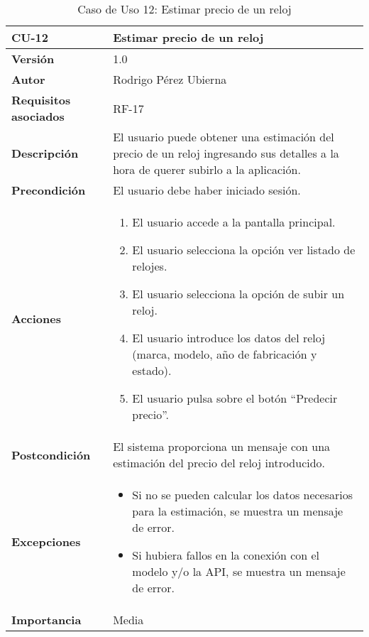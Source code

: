 \begin{table}[p]
	\centering
	\begin{tabularx}{\linewidth}{ p{} p{} }
		\toprule
		\textbf{CU-12} & \textbf{Estimar precio de un reloj}\\
		\toprule
		\textbf{Versión} & 1.0 \\
		\textbf{Autor} & Rodrigo Pérez Ubierna \\
		\textbf{Requisitos asociados} & RF-17 \\
		\textbf{Descripción} & El usuario puede obtener una estimación del precio de un reloj ingresando sus detalles a la hora de querer subirlo a la aplicación. \\
		\textbf{Precondición} & El usuario debe haber iniciado sesión. \\
		\textbf{Acciones} &
		\begin{enumerate}
			\def\labelenumi{\arabic{enumi}.}
			\tightlist
			\item El usuario accede a la pantalla principal.
			\item El usuario selecciona la opción ver listado de relojes.
			\item El usuario selecciona la opción de subir un reloj.
			\item El usuario introduce los datos del reloj (marca, modelo, año de fabricación y estado).
			\item El usuario pulsa sobre el botón ``Predecir precio''.
		\end{enumerate}\\
		\textbf{Postcondición} & El sistema proporciona un mensaje con una estimación del precio del reloj introducido. \\
		\textbf{Excepciones} &
			\begin{itemize}
				\item Si no se pueden calcular los datos necesarios para la estimación, se muestra un mensaje de error.
				\item Si hubiera fallos en la conexión con el modelo y/o la API, se muestra un mensaje de error.
			\end{itemize} \\
		\textbf{Importancia} & Media \\
		\bottomrule
	\end{tabularx}
	\caption{Caso de Uso 12: Estimar precio de un reloj}
\end{table}

